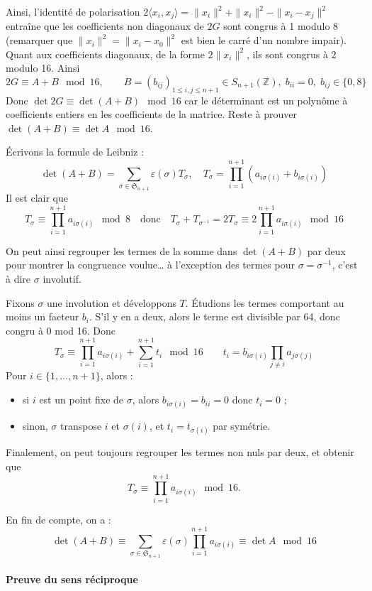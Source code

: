 \documentclass[a4paper, 11pt]{article}
\def\Z{\mathbb{Z}}
\def\Sigmap{\mathfrak{S}}
\begin{document}
Ainsi, l'identité de polarisation $2 \langle x_i, x_j \rangle = \|x_i\|^2 +
\|x_i\|^2 - \|x_i - x_j\|^2$ entraîne que les coefficients non diagonaux de $2G$
sont congrus à 1 modulo 8 (remarquer que $\|x_i\|^2 = \|x_i - x_0\|^2$ est bien
le carré d'un nombre impair). Quant aux coefficients diagonaux, de la forme
$2\|x_i\|^2$, ils sont congrus à 2 modulo 16. Ainsi
\[ 2G \equiv A + B \mod 16, \qquad B = (b_{ij})_{1 \leq i,j \leq n+1} \in
  S_{n+1}(\Z),\; b_{ii} = 0,\; b_{ij} \in \{0,8\} \]
Donc $\det 2G \equiv \det(A+B) \mod 16$ car le déterminant est un polynôme à
coefficients entiers en les coefficients de la matrice. Reste à prouver
$\det(A+B) \equiv \det A \mod 16$.

Écrivons la formule de Leibniz :
\[ \det(A+B) = \sum_{\sigma \in \Sigmap_{n+1}} \varepsilon(\sigma) T_\sigma,
  \quad T_\sigma = \prod_{i=1}^{n+1} (a_{i \sigma(i)} + b_{i \sigma(i)}) \]
Il est clair que
\[ T_\sigma \equiv \prod_{i=1}^{n+1} a_{i \sigma(i)} \mod 8 \quad \text{donc}
  \quad T_\sigma + T_{\sigma^{-1}} = 2 T_\sigma \equiv 2 \prod_{i=1}^{n+1} a_{i
    \sigma(i)} \mod 16 \]

On peut ainsi regrouper les termes de la somme dans $\det(A+B)$ par deux pour
montrer la congruence voulue… à l'exception des termes pour $\sigma =
\sigma^{-1}$, c'est à dire $\sigma$ involutif.

Fixons $\sigma$ une involution et développons $T$. Étudions les termes
comportant au moins un facteur $b_i$. S'il y en a deux, alors le terme est
divisible par 64, donc congru à 0 mod 16. Donc
\[ T_\sigma \equiv \prod_{i=1}^{n+1} a_{i \sigma(i)} + \sum_{i=1}^{n+1} t_i
   \mod 16 \qquad t_i = b_{i \sigma(i)} \prod_{j \neq i} a_{j \sigma(j)} \]
Pour $i \in \{1, \ldots, n+1\}$, alors :
\begin{itemize}
\item si $i$ est un point fixe de $\sigma$, alors $b_{i \sigma(i)} = b_{ii} = 0$
  donc $t_i = 0$ ;
\item sinon, $\sigma$ transpose $i$ et $\sigma(i)$, et $t_i = t_{\sigma(i)}$ par
  symétrie.
\end{itemize}
Finalement, on peut toujours regrouper les termes non nuls par deux, et obtenir
que
\[ T_\sigma \equiv \prod_{i=1}^{n+1} a_{i \sigma(i)} \mod 16. \]

En fin de compte, on a :
\[ \det(A+B) \equiv \sum_{\sigma \in \Sigmap_{n+1}} \varepsilon(\sigma)
  \prod_{i=1}^{n+1} a_{i \sigma(i)} \equiv \det A \mod 16 \]

\paragraph{Preuve du sens réciproque}
\end{document}

